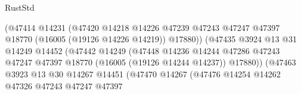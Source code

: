 \begin{lexlean}{RustStd}
\begin{coremodule}
                                              (@47414
                                                @14231
                                                (@47420
                                                  @14218
                                                  @14226
                                                  @47239
                                                  @47243
                                                  @47247
                                                  @47397
                                                  @18770
                                                  (@16005 (@19126 @14226 @14219))
                                                  @17880))
                                              (@47435
                                                @3924
                                                @13
                                                @31
                                                @14249
                                                @14452
                                                (@47442
                                                  @14249
                                                  (@47448
                                                    @14236
                                                    @14244
                                                    @47286
                                                    @47243
                                                    @47247
                                                    @47397
                                                    @18770
                                                    (@16005 (@19126 @14244 @14237))
                                                    @17880))
                                                (@47463
                                                  @3923
                                                  @13
                                                  @30
                                                  @14267
                                                  @14451
                                                  (@47470
                                                    @14267
                                                    (@47476
                                                      @14254
                                                      @14262
                                                      @47326
                                                      @47243
                                                      @47247
                                                      @47397

\end{coremodule}
\end{lexlean}
